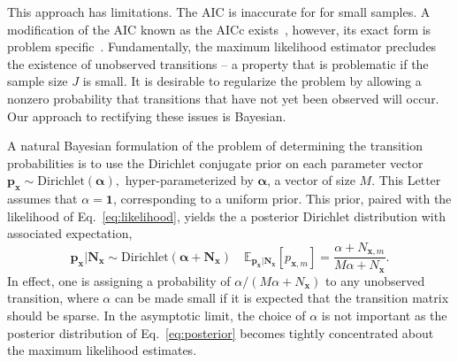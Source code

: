 \documentclass[prl,twocolumn,groupedaddress]{revtex4-1}
\newcommand{\bN}{\mathbf{N}}
\newcommand{\bx}{\mathbf{x}}
\newcommand{\bp}{\mathbf{p}}
\begin{document}
This approach has limitations. The AIC is inaccurate for for small samples. A modification of the AIC known as the AICc exists~\cite{hurvich1989regression}, however, its exact form is problem specific~\cite{burnham2003model}. Fundamentally,
the maximum likelihood estimator precludes the existence of unobserved transitions -- a property that is problematic if  the sample size $J$ is small.
It is desirable to regularize the problem by allowing a nonzero probability that
transitions that have not yet been observed will occur. Our approach to rectifying these issues is Bayesian.


A natural Bayesian formulation of the
problem of determining the transition probabilities is to use the Dirichlet conjugate prior
on each parameter vector
$
\mathbf{p}_{\bx} \sim \mathrm{Dirichlet}(\boldsymbol\alpha),
$
 hyper-parameterized by $\boldsymbol\alpha$, a vector of size $M$. This Letter assumes that $\alpha=\mathbf{1}$, corresponding to a uniform prior. This prior, paired with the likelihood of Eq.~\ref{eq:likelihood}, %
yields the a posterior Dirichlet distribution with associated expectation,
\begin{equation}
\mathbf{p}_{\bx}  \vert \mathbf{N}_{\bx} \sim \mathrm{Dirichlet}(\boldsymbol\alpha + \mathbf{N}_{\bx} ) \quad \mathbb{E}_{\bp_\bx\vert\bN_\bx} [p_{\bx,m}] = \frac{\alpha + N_{\bx,m}}{M\alpha+ N_{\bx}}.\label{eq:posterior}
\end{equation}
In effect, one is assigning a probability of $\alpha/(M\alpha+N_{\bx})$ to any unobserved transition, where $\alpha$ can be made small if it is expected that the transition matrix should be sparse.   In the asymptotic limit, the choice of $\alpha$ is not important as the posterior distribution of Eq.~\ref{eq:posterior}  becomes tightly concentrated about the maximum likelihood estimates.
\end{document}
